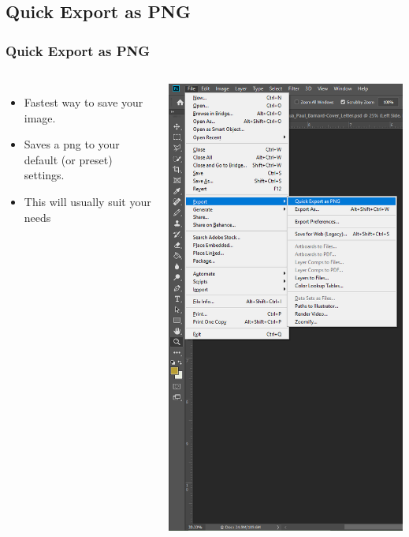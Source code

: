 \documentclass{beamer}
\begin{document}
\subsection{Quick Export as PNG}
\begin{frame}
	\frametitle{Quick Export as PNG}	
	\begin{columns}
		\vspace{-75pt}
		\begin{itemize}
			\item Fastest way to save your image.
			\item Saves a png to your default (or preset) settings.  
			\item This will usually suit your needs
		\end{itemize}
		\includegraphics[width=1.0\textwidth]{images/Screenshot_5.png}
	\end{columns}
\end{frame}
\end{document}
